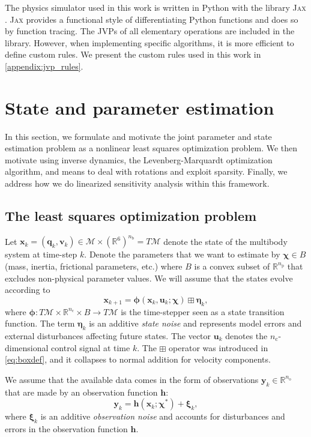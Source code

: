\documentclass[preprint,12pt]{elsarticle}
\let\vec\bm
\def\param{\vec{\chi}}
\let\amssymbboxplus\boxplus
\renewcommand{\boxplus}{\mathbin{\mathop\amssymbboxplus}}
\numberwithin{equation}{section}
\def\tc{\text{c}}
\def\step{\phi}
\def\statenoise{\eta}
\def\obsnoise{\xi}
\begin{document}
The physics simulator used in this work is written in Python with the library \textsc{Jax} \cite{jax2018github}.
\textsc{Jax} provides a functional style of differentiating Python functions and does so by function tracing. The JVPs of all elementary operations are included in the library.
However, when implementing specific algorithms, it is more efficient to define custom rules.
We present the custom rules used in this work in \ref{appendix:jvp_rules}.

\section{State and parameter estimation}
\label{sec:parameter_identification}
In this section, we formulate and motivate the joint parameter and state estimation problem as a nonlinear least squares optimization problem.
We then motivate using inverse dynamics, the Levenberg-Marquardt optimization algorithm, and means to deal with rotations and exploit sparsity.
Finally, we address how we do linearized sensitivity analysis within this framework.

\subsection{The least squares optimization problem}
Let $\vec{x}_k = (\vec{q}_k, \vec{v}_k) \in \mathcal{M} \times (\mathbb{R}^6)^{n_\text{b}} = T\mathcal{M}$ denote the state of the multibody system at time-step $k$. 
Denote the parameters that we want to estimate by $\param \in B$ (mass, inertia, frictional parameters, etc.) where $B$ is a convex subset of $\mathbb{R}^{n_\text{p}}$ that excludes non-physical parameter values.
We will assume that the states evolve according to
\begin{equation}
    \label{eq:state}
    \vec{x}_{k+1} = \vec{\step}(\vec{x}_k, \vec{u}_k; \param) \boxplus \vec{\eta}_k,
\end{equation}
where $\vec{\step}: T\mathcal{M} \times \mathbb{R}^{n_\tc} \times B \to T\mathcal{M}$ is the time-stepper seen as a state transition function.
The term $\vec{\statenoise}_k$ is an additive \emph{state noise} and represents model errors and external disturbances affecting future states.
The vector $\vec{u}_k$ denotes the $n_\tc$-dimensional control signal at time $k$.
The $\boxplus$ operator was introduced in \eqref{eq:boxdef}, and it collapses to normal addition for velocity components.

We assume that the available data comes in the form of observations $\vec{y}_k \in \mathbb{R}^{n_\text{o}}$ that are made by an observation function $\vec{h}$:
\begin{equation}
    \label{eq:observation}
    \vec{y}_k  = \vec{h}(\vec{x}_{k}; \param^*) + \vec{\obsnoise}_k,
\end{equation}
where $\vec{\obsnoise}_k$ is an additive \emph{observation noise} and accounts for disturbances and errors in the observation function $\vec{h}$.
\end{document}
